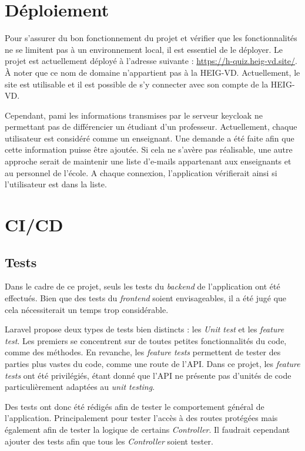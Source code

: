 \section{Déploiement}
Pour s'assurer du bon fonctionnement du projet et vérifier que les fonctionnalités ne se limitent pas à un environnement local, il est essentiel de le déployer. Le projet est actuellement déployé à l'adresse suivante : \url{https://h-quiz.heig-vd.site/}. À noter que ce nom de domaine n'appartient pas à la HEIG-VD. Actuellement, le site est utilisable et il est possible de s'y connecter avec son compte de la HEIG-VD.

Cependant, pami les informations transmises par le serveur keycloak ne permettant pas de différencier un étudiant d'un professeur. Actuellement, chaque utilisateur est considéré comme un enseignant. Une demande a été faite afin que cette information puisse être ajoutée. Si cela ne s'avère pas réalisable, une autre approche serait de maintenir une liste d'e-mails appartenant aux enseignants et au personnel de l'école. A chaque connexion, l'application vérifierait ainsi si l'utilisateur est dans la liste.

\section{CI/CD}
\subsection{Tests}
Dans le cadre de ce projet, seuls les tests du \emph{backend} de l'application ont été effectués. Bien que des tests du \emph{frontend} soient envisageables, il a été jugé que cela nécessiterait un temps trop considérable.

Laravel propose deux types de tests bien distincts : les \emph{Unit test} et les \emph{feature test}. Les premiers se concentrent sur de toutes petites fonctionnalités du code, comme des méthodes. En revanche, les \emph{feature tests} permettent de tester des parties plus vastes du code, comme une route de l'API. Dans ce projet, les \emph{feature tests} ont été privilégiés, étant donné que l'API ne présente pas d'unités de code particulièrement adaptées au \emph{unit testing}.

Des tests ont donc été rédigés afin de tester le comportement général de l'application. Principalement pour tester l'accès à des routes protégées mais également afin de tester la logique de certains \emph{Controller}. Il faudrait cependant ajouter des tests afin que tous les \emph{Controller} soient tester.

